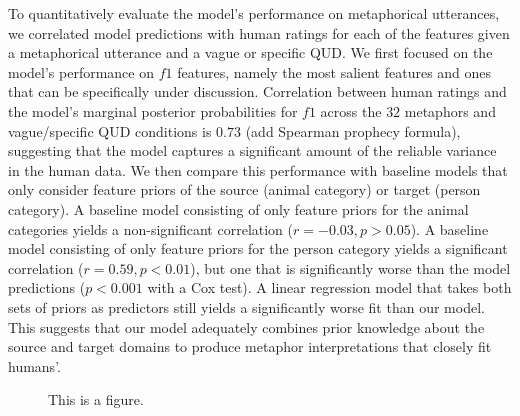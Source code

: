 \documentclass[10pt,letterpaper]{article}
\begin{document}
To quantitatively evaluate the model's performance on metaphorical utterances, we correlated model predictions with human ratings for each of the features given a metaphorical utterance and a vague or specific QUD. We first focused on the model's performance on $f1$ features, namely the most salient features and ones that can be specifically under discussion. Correlation between human ratings and the model's marginal posterior probabilities for $f1$ across the $32$ metaphors and vague/specific QUD conditions is $0.73$ (add Spearman prophecy formula), suggesting that the model captures a significant amount of the reliable variance in the human data. We then compare this performance with baseline models that only consider feature priors of the source (animal category) or target (person category). A baseline model consisting of only feature priors for the animal categories yields a non-significant correlation ($r=-0.03, p > 0.05$). A baseline model consisting of only feature priors for the person category yields a significant correlation ($r=0.59, p < 0.01$), but one that is significantly worse than the model predictions ($p < 0.001$ with a Cox test). A linear regression model that takes both sets of priors as predictors still yields a significantly worse fit than our model. This suggests that our model adequately combines prior knowledge about the source and target domains to produce metaphor interpretations that closely fit humans'.
\begin{figure}[ht]
\begin{center}
\end{center}
\caption{This is a figure.} 
\label{scatter_full}
\end{figure}
\end{document}
